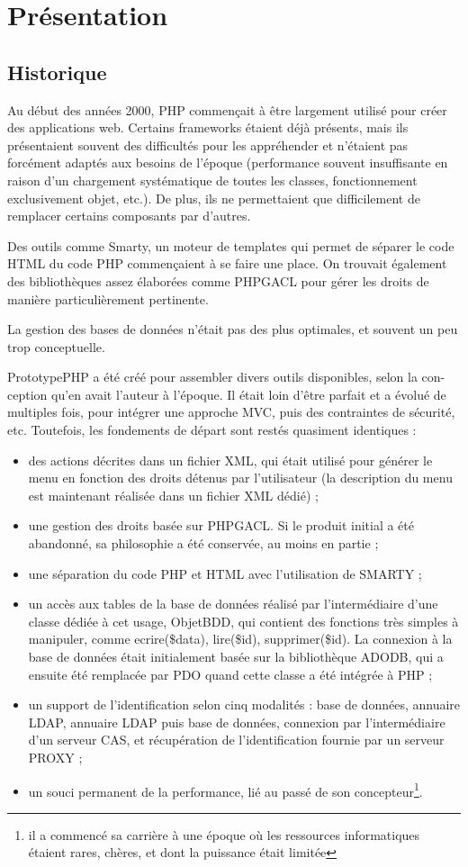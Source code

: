 \chapter{Présentation}
\section{Historique}
Au début des années 2000, PHP commençait à être largement utilisé pour créer des applications web. Certains frameworks étaient déjà présents, mais ils présentaient souvent des difficultés pour les appréhender et n'étaient pas forcément adaptés aux besoins de l'époque (performance souvent insuffisante en raison d'un chargement systématique de toutes les classes, fonctionnement exclusivement objet, etc.). De plus, ils ne permettaient que difficilement de remplacer certains composants par d'autres.

Des outils comme Smarty, un moteur de templates qui permet de séparer le code HTML du code PHP commençaient à se faire une place. On trouvait également des bibliothèques assez élaborées comme PHPGACL pour gérer les droits de manière particulièrement pertinente.

La gestion des bases de données n'était pas des plus optimales, et souvent un peu trop conceptuelle.

PrototypePHP a été créé pour assembler divers outils disponibles, selon la con-ception qu'en avait l'auteur à l'époque. Il était loin d'être parfait et a évolué de multiples fois, pour intégrer une approche MVC, puis des contraintes de sécurité, etc. Toutefois, les fondements de départ sont restés quasiment identiques :
\begin{itemize}
\item des actions décrites dans un fichier XML, qui était utilisé pour générer le menu en fonction des droits détenus par l'utilisateur (la description du menu est maintenant réalisée dans un fichier XML dédié) ;
\item une gestion des droits basée sur PHPGACL. Si le produit initial a été abandonné, sa philosophie a été conservée, au moins en partie ;
\item une séparation du code PHP et HTML avec l'utilisation de SMARTY ;
\item un accès aux tables de la base de données réalisé par l'intermédiaire d'une classe dédiée à cet usage, ObjetBDD, qui contient des fonctions très simples à manipuler, comme ecrire(\$data), lire(\$id), supprimer(\$id). La connexion à la base de données était initialement basée sur la bibliothèque ADODB, qui a ensuite été remplacée par PDO quand cette classe a été intégrée à PHP ;
\item un support de l'identification selon cinq modalités : base de données, annuaire LDAP, annuaire LDAP puis base de données, connexion par l'intermédiaire d'un serveur CAS, et récupération de l'identification fournie par un serveur PROXY  ;
\item un souci permanent de la performance, lié au passé de son concepteur\footnote{il a commencé sa carrière à une époque où les ressources informatiques étaient rares, chères, et dont la puissance était limitée}.
\end{itemize}

